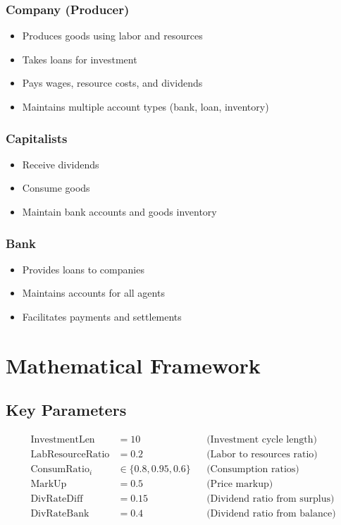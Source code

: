 \documentclass{article}
\begin{document}
\subsubsection{Company (Producer)}
\begin{itemize}
    \item Produces goods using labor and resources
    \item Takes loans for investment
    \item Pays wages, resource costs, and dividends
    \item Maintains multiple account types (bank, loan, inventory)
\end{itemize}

\subsubsection{Capitalists}
\begin{itemize}
    \item Receive dividends
    \item Consume goods
    \item Maintain bank accounts and goods inventory
\end{itemize}

\subsubsection{Bank}
\begin{itemize}
    \item Provides loans to companies
    \item Maintains accounts for all agents
    \item Facilitates payments and settlements
\end{itemize}

\section{Mathematical Framework}

\subsection{Key Parameters}
\begin{align*}
    \text{InvestmentLen} &= 10 && \text{(Investment cycle length)} \\
    \text{LabResourceRatio} &= 0.2 && \text{(Labor to resources ratio)} \\
    \text{ConsumRatio}_i &\in \{0.8, 0.95, 0.6\} && \text{(Consumption ratios)} \\
    \text{MarkUp} &= 0.5 && \text{(Price markup)} \\
    \text{DivRateDiff} &= 0.15 && \text{(Dividend ratio from surplus)} \\
    \text{DivRateBank} &= 0.4 && \text{(Dividend ratio from balance)}
\end{align*}
\end{document}
